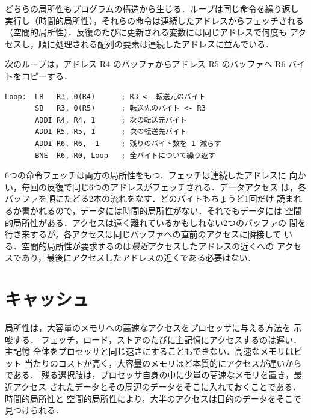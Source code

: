 \documentclass[../main.tex]{subfiles}
\begin{document}
どちらの局所性もプログラムの構造から生じる．ループは同じ命令を繰り返し
実行し（時間的局所性），それらの命令は連続したアドレスからフェッチされる
（空間的局所性）．反復のたびに更新される変数には同じアドレスで何度も
アクセスし，順に処理される配列の要素は連続したアドレスに並んでいる．

\begin{example}
  \label{ex:l12-locality}
  次のループは，アドレス R4 のバッファからアドレス R5 のバッファへ R6
  バイトをコピーする．
  \begin{lstlisting}[language={[x86masm]Assembler}, numbers=none]
Loop:  LB   R3, 0(R4)      ; R3 <- 転送元のバイト
       SB   R3, 0(R5)      ; 転送先のバイト <- R3
       ADDI R4, R4, 1      ; 次の転送元バイト
       ADDI R5, R5, 1      ; 次の転送先バイト
       ADDI R6, R6, -1     ; 残りのバイト数を 1 減らす
       BNE  R6, R0, Loop   ; 全バイトについて繰り返す
\end{lstlisting}
  6つの命令フェッチは両方の局所性をもつ．フェッチは連続したアドレスに
  向かい，毎回の反復で同じ6つのアドレスがフェッチされる．データアクセス
  は，各バッファを順にたどる2本の流れをなす．どのバイトもちょうど1回だけ
  読まれるか書かれるので，データには時間的局所性がない．それでもデータには
  空間的局所性がある．アクセスは遠く離れているかもしれない2つのバッファの
  間を行き来するが，各アクセスは同じバッファへの直前のアクセスに隣接して
  いる．空間的局所性が要求するのは\emph{最近}アクセスしたアドレスの近くへの
  アクセスであり，最後にアクセスしたアドレスの近くである必要はない．
\end{example}

\section{キャッシュ}
\label{sec:l12-caches}

局所性は，大容量のメモリへの高速なアクセスをプロセッサに与える方法を
示唆する．
フェッチ，ロード，ストアのたびに主記憶にアクセスするのは遅い．主記憶
全体をプロセッサと同じ速さにすることもできない．高速なメモリはビット
当たりのコストが高く，大容量のメモリほど本質的にアクセスが遅いからである．
残る選択肢は，プロセッサ自身の中に少量の高速なメモリを置き，最近アクセス
されたデータとその周辺のデータをそこに入れておくことである．時間的局所性と
空間的局所性により，大半のアクセスは目的のデータをそこで見つけられる．
\end{document}
